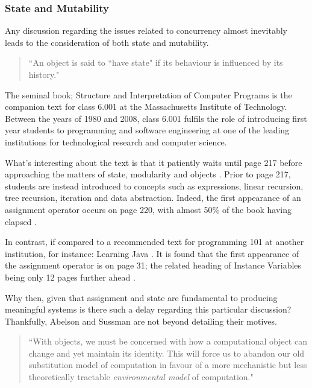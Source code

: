 \documentclass[12pt,a4paper]{article}
\begin{document}
\subsubsection{State and Mutability}

Any discussion regarding the issues related to concurrency almost inevitably leads to the consideration of both state and mutability.

\begin{quote}
    ``An object is said to ``have state" if its behaviour is influenced by its history." \cite{structureAndInterpretation}
\end{quote}

The seminal book; Structure and Interpretation of Computer Programs \cite{structureAndInterpretation} is the companion text for class 6.001 at the Massachusetts Institute of Technology. Between the years of 1980 and 2008, class 6.001 fulfils the role of introducing first year students to programming and software engineering at one of the leading institutions for technological research and computer science.

What's interesting about the text is that it patiently waits until page 217 before approaching the matters of state, modularity and objects \cite{structureAndInterpretation}. Prior to page 217, students are instead introduced to concepts such as expressions, linear recursion, tree recursion, iteration and data abstraction. Indeed, the first appearance of an assignment operator occurs on page 220, with almost 50\% of the book having elapsed \cite{structureAndInterpretation}.

In contrast, if compared to a recommended text for programming 101 at another institution, for instance: Learning Java \cite{learningJava}. It is found that the first appearance of the assignment operator is on page 31; the related heading of Instance Variables being only 12 pages further ahead \cite{learningJava}.

Why then, given that assignment and state are fundamental to producing meaningful systems \cite{structureAndInterpretation} is there such a delay regarding this particular discussion? Thankfully, Abelson and Sussman are not beyond detailing their motives.

\begin{quote}
    ``With objects, we must be concerned with how a computational object can change and yet maintain its identity. This will force us to abandon our old substitution model of computation in favour of a more mechanistic but less theoretically tractable \textit{environmental model} of computation." \cite{structureAndInterpretation}
\end{quote}
\end{document}
